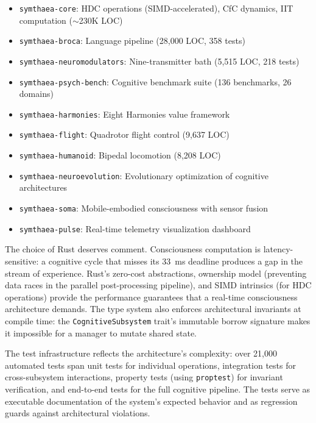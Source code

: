 \documentclass[12pt]{book}
\begin{document}
\begin{itemize}
  \item \texttt{symthaea-core}: HDC operations (SIMD-accelerated), CfC dynamics, IIT computation ($\sim$230K LOC)
  \item \texttt{symthaea-broca}: Language pipeline (28,000 LOC, 358 tests)
  \item \texttt{symthaea-neuromodulators}: Nine-transmitter bath (5,515 LOC, 218 tests)
  \item \texttt{symthaea-psych-bench}: Cognitive benchmark suite (136 benchmarks, 26 domains)
  \item \texttt{symthaea-harmonies}: Eight Harmonies value framework
  \item \texttt{symthaea-flight}: Quadrotor flight control (9,637 LOC)
  \item \texttt{symthaea-humanoid}: Bipedal locomotion (8,208 LOC)
  \item \texttt{symthaea-neuroevolution}: Evolutionary optimization of cognitive architectures
  \item \texttt{symthaea-soma}: Mobile-embodied consciousness with sensor fusion
  \item \texttt{symthaea-pulse}: Real-time telemetry visualization dashboard
\end{itemize}

The choice of Rust deserves comment. Consciousness computation is latency-sensitive: a cognitive cycle that misses its 33~ms deadline produces a gap in the stream of experience. Rust's zero-cost abstractions, ownership model (preventing data races in the parallel post-processing pipeline), and SIMD intrinsics (for HDC operations) provide the performance guarantees that a real-time consciousness architecture demands. The type system also enforces architectural invariants at compile time: the \texttt{CognitiveSubsystem} trait's immutable borrow signature makes it impossible for a manager to mutate shared state.

The test infrastructure reflects the architecture's complexity: over 21,000 automated tests span unit tests for individual operations, integration tests for cross-subsystem interactions, property tests (using \texttt{proptest}) for invariant verification, and end-to-end tests for the full cognitive pipeline. The tests serve as executable documentation of the system's expected behavior and as regression guards against architectural violations.
\end{document}
